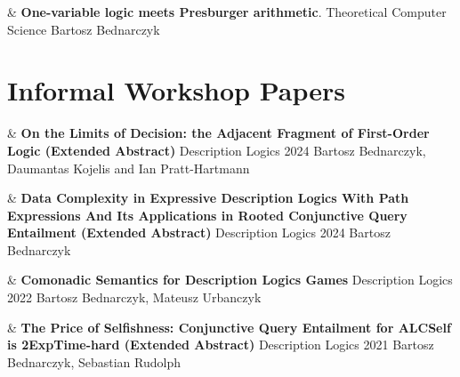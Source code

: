 \documentclass[10pt,a4paper]{article}
\begin{document}
\begin{EntriesTableYear}
  &
  \textbf{One-variable logic meets Presburger arithmetic}.
  \newline
  Theoretical Computer Science
  \newline
 Bartosz Bednarczyk
  \\
\end{EntriesTableYear}



\section{Informal Workshop Papers}

\begin{EntriesTableYear}
    &
    \textbf{On the Limits of Decision: the Adjacent Fragment of First-Order Logic (Extended Abstract)}
    \newline
    Description Logics 2024
    \newline
    Bartosz Bednarczyk, Daumantas Kojelis and Ian Pratt-Hartmann  
    \\
  \end{EntriesTableYear}

  \begin{EntriesTableYear}
      &
      \textbf{Data Complexity in Expressive Description Logics With Path Expressions And Its Applications in Rooted Conjunctive Query Entailment (Extended Abstract)}
      \newline
      Description Logics 2024
      \newline
      Bartosz Bednarczyk
      \\
    \end{EntriesTableYear}

\begin{EntriesTableYear}
  &
  \textbf{Comonadic Semantics for Description Logics Games}
  \newline
  Description Logics 2022
  \newline
  Bartosz Bednarczyk, Mateusz Urbanczyk
  \\
\end{EntriesTableYear}

\begin{EntriesTableYear}
  &
  \textbf{The Price of Selfishness: Conjunctive Query Entailment for ALCSelf is 2ExpTime-hard (Extended Abstract)}
  \newline
  Description Logics 2021
  \newline
 Bartosz Bednarczyk, Sebastian Rudolph
  \\
\end{EntriesTableYear}
\end{document}
